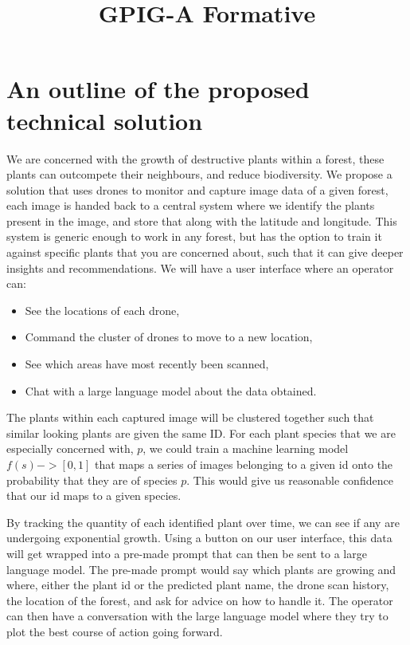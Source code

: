 \documentclass{article}
\title{GPIG-A Formative}
\begin{document}
\maketitle

\section{An outline of the proposed technical solution}

We are concerned with the growth of destructive plants within a forest, these plants can outcompete their neighbours, and reduce biodiversity. 
We propose a solution that uses drones to monitor and capture image data of a given forest, each image is handed back to a central system where we identify the plants present in the image, and store that along with the latitude and longitude. 
This system is generic enough to work in any forest, but has the option to train it against specific plants that you are concerned about, such that it can give deeper insights and recommendations.
We will have a user interface where an operator can:
\begin{itemize}[noitemsep,topsep=3pt]
\item See the locations of each drone,
\item Command the cluster of drones to move to a new location,
\item See which areas have most recently been scanned,
\item Chat with a large language model about the data obtained.
\end{itemize}


The plants within each captured image will be clustered together such that similar looking plants are given the same ID. 
For each plant species that we are especially concerned with, $p$, we could train a machine learning model $f(s) -> [0,1]$ that maps a series of images belonging to a given id onto the probability that they are of species $p$. 
This would give us reasonable confidence that our id maps to a given species.

By tracking the quantity of each identified plant over time, we can see if any are undergoing exponential growth.
Using a button on our user interface, this data will get wrapped into a pre-made prompt that can then be sent to a large language model.
The pre-made prompt would say which plants are growing and where, either the plant id or the predicted plant name, the drone scan history, the location of the forest, and ask for advice on how to handle it.
The operator can then have a conversation with the large language model where they try to plot the best course of action going forward.
\end{document}
